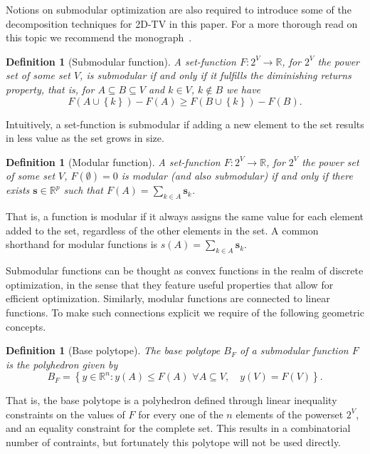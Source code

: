 \documentclass[twoside,11pt]{article}
\newcommand{\vs}{\bm{s}}       \newcommand{\vsh}{\hat{\bm{s}}}        \newcommand{\sh}{\hat{s}}    \newcommand{\vst}{\tilde{\bm{s}}}       \newcommand{\st}{\tilde{s}}
\newtheorem{defn}[theorem]{Definition}
\numberwithin{equation}{section}
\numberwithin{theorem}{section}
\begin{document}
Notions on submodular optimization are also required to introduce some of the decomposition techniques for 2D-TV in this paper. For a more thorough read on this topic we recommend the monograph~\citet{Bach13}.

\begin{defn}[Submodular function]
  A set-function $F: 2^V \rightarrow \mathbb{R}$, for $2^V$ the power set of some set $V$, is submodular if and only if it fulfills the diminishing returns property, that is, for $A \subseteq B \subseteq V$ and $k \in V$, $k \notin B$ we have
  \begin{equation*}
     F(A \cup \left\lbrace k \right\rbrace) - F(A) \geq F(B \cup \left\lbrace k \right\rbrace) - F(B) .
  \end{equation*}
\end{defn}
Intuitively, a set-function is submodular if adding a new element to the set results in less value as the set grows in size.

\begin{defn}[Modular function]
  A set-function $F: 2^V \rightarrow \mathbb{R}$, for $2^V$ the power set of some set $V$, $F(\emptyset) = 0$ is modular (and also submodular) if and only if there exists $\vs \in \mathbb{R}^p$ such that $F(A) = \sum_{k \in A} \vs_k$.
\end{defn}
That is, a function is modular if it always assigns the same value for each element added to the set, regardless of the other elements in the set. A common shorthand for modular functions is $s(A) = \sum_{k \in A} \vs_k$.

Submodular functions can be thought as convex functions in the realm of discrete optimization, in the sense that they feature useful properties that allow for efficient optimization. Similarly, modular functions are connected to linear functions. To make such connections explicit we require of the following geometric concepts.

\begin{defn}[Base polytope]
  The base polytope $B_F$ of a submodular function $F$ is the polyhedron given by
  \begin{equation*}
   B_F = \left\lbrace y \in \mathbb{R}^n: y(A) \leq F(A) \,\, \forall A \subseteq V, \quad y(V) = F(V) \right\rbrace .
  \end{equation*}
\end{defn}
That is, the base polytope is a polyhedron defined through linear inequality constraints on the values of $F$ for every one of the $n$ elements of the powerset $2^V$, and an equality constraint for the complete set. This results in a combinatorial number of contraints, but fortunately this polytope will not be used directly.
\end{document}
